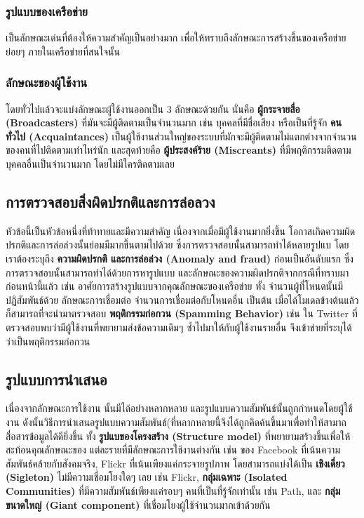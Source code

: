 \subsubsection{รูปแบบของเครือข่าย} เป็นลักษณะเด่นที่ต้องให้ความสำคัญเป็นอย่างมาก
เพื่อให้ทราบถึงลักษณะการสร้างขึ้นของเครือข่ายย่อยๆ ภายในเครือข่ายที่สนใจนั้น  

\subsubsection{ลักษณะของผู้ใช้งาน} โดยทั่วไปแล้วจะแบ่งลักษณะผู้ใช้งานออกเป็น 3 ลักษณะด้วยกัน
นั่นคือ \textbf{ผู้กระจายสื่อ (Broadcasters)} ที่มันจะมีผู้ติดตามเป็นจำนวนมาก เช่น
บุคคลที่มีชื่อเสียง หรือเป็นที่รู้จัก \textbf{คนทั่วไป (Acquaintances)} 
เป็นผู้ใช้งานส่วนใหญ่ของระบบที่มักจะมีผู้ติดตามไม่แตกต่างจากจำนวนของคนที่ไปติดตามเท่าไหร่นัก
และสุดท้ายคือ \textbf{ผู้ประสงค์ร้าย (Miscreants)} ที่มีพฤติกรรมติดตามบุคคลอื่นเป็นจำนวนมาก
โดยไม่มีใครติดตามเลย

\subsection{การตรวจสอบสิ่งผิดปรกติและการล่อลวง}
หัวข้อนี้เป็นหัวข้อหนึ่งที่ท้าทายและมีความสำคัญ เนื่องจากเมื่อมีผู้ใช้งานมากยิ่งขึ้น 
โอกาสเกิดความผิดปรกติและการล่อล่วงนั้นย่อมมีมากขึ้นตามไปด้วย ซึ่งการตรวจสอบนั้นสามารถทำได้หลายรูปแบ
โดยเราต้องระบุถึง \textbf{ความผิดปรกติ และการล่อล่วง (Anomaly and fraud)} ก่อนเป็นอันดับแรก
ซึ่งการตรวจสอบนั้นสามารถทำได้ด้วยการหารูปแบบ และลักษณะของความผิดปรกติจากกรณีที่ทราบมาก่อนหน้านี้แล้ว
เช่น อาศัยการสร้างรูปแบบจากคุณลักษณะของเครือข่าย ทั้ง จำนวนผู้ที่โหนดนั้นมีปฏิสัมพันธ์ด้วย 
ลักษณะการเชื่อมต่อ จำนวนการเชื่อมต่อกับโหนดอื่น เป็นต้น เมื่อได้โมเดลข้างต้นแล้วก็สามารถที่จะนำมาตรวจสอบ
\textbf{พฤติกรรมก่อกวน (Spamming Behavior)} เช่น ใน Twitter ที่ตรวจสอบพบว่ามีผู้ใช้งานที่พยายามส่งข้อความเดิมๆ 
ซ้ำไปมาให้กับผู้ใช้งานรายอื่น จึงเข้าข่ายที่ระบุได้ว่าเป็นพฤติกรรมก่อกวน

\subsection{รูปแบบการนำเสนอ}

เนื่องจากลักษณะการใช้งาน{\OSN} นั้นมีได้อย่างหลากหลาย และรูปแบบความสัมพันธ์นั้นถูกกำหนดโดยผู้ใช้งาน
ดังนั้นวิธีการนำเสนอรูปแบบความสัมพันธ์(ที่หลากหลายนี้จึงได้ถูกคิดค้นขึ้นมาเพื่อทำให้สามาถสื่อสารข้อมูลได้ดียิ่งขึ้น
ทั้ง \textbf{รูปแบของโครงสร้าง (Structure model)} ที่พยายามสร้างขึ้นเพื่อให้สะท้อนคุณลักษณะของ{\SNS}
แต่ละรายที่มีลักษณะการใช้งานต่างกัน เช่น ของ Facebook ที่เน้นความสัมพันธ์คล้ายกับสังคมจริง, 
Flickr ที่เน้นเพียงแค่กระจายรูปภาพ โดยสามารถแบ่งได้เป็น \textbf{เชิงเดี่ยว (Sigleton)} 
ไม่มีความเชื่อมโยงใดๆ เลย เช่น Flickr, \textbf{กลุ่มเฉพาะ (Isolated Communities)}
ที่มีความสัมพันธ์เพียงแค่รอบๆ คนที่เป็นที่รู้จักเท่านั้น เช่น Path, และ \textbf{กลุ่มขนาดใหญ่ (Giant component)} 
ที่เชื่อมโยงผู้ใช้จำนวนมากเข้าด้วยกัน
